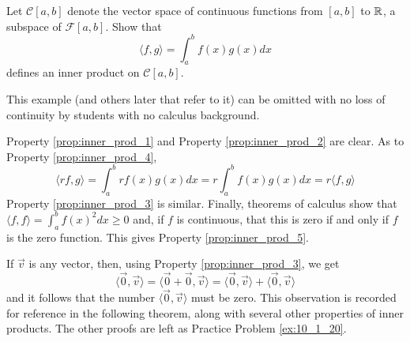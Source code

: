 \documentclass{ximera}
\begin{document}
\begin{example}\label{exa:030334}
Let $\mathcal{C}[a, b]$ denote the vector space of
continuous functions from $[a, b]$ to $\mathbb{R}$, a subspace of $\mathcal{F}[a, b]$. Show that
\begin{equation*}
\langle f, g \rangle = \int_{a}^{b} f(x)g(x)dx
\end{equation*}
defines an inner product on $\mathcal{C}[a, b]$.

\begin{remark}
    This example (and others later that refer to it) can be omitted with no loss of continuity by students with no calculus background.
\end{remark}

\begin{explanation}
 Property \ref{prop:inner_prod_1} and Property \ref{prop:inner_prod_2} are clear. As to  Property \ref{prop:inner_prod_4},
\begin{equation*}
\langle rf, g \rangle = \int_{a}^{b} rf(x)g(x)dx = r\int_{a}^{b} f(x)g(x)dx =
r\langle f, g \rangle
\end{equation*}
 Property \ref{prop:inner_prod_3} is similar. Finally, theorems of calculus show that $\langle f, f \rangle = \int_{a}^{b} f(x)^2dx \geq 0$ and, if $f$ is continuous, that this is zero if and only if $f$ is the zero function. This gives  Property \ref{prop:inner_prod_5}.
\end{explanation}
\end{example}


If $\vec{v}$ is any vector, then, using  Property \ref{prop:inner_prod_3}, we get
\begin{equation*}
\langle \vec{0}, \vec{v} \rangle = \langle \vec{0} + \vec{0}, \vec{v} \rangle =
\langle \vec{0}, \vec{v} \rangle + \langle \vec{0}, \vec{v} \rangle
\end{equation*}
and it follows that the number $\langle\vec{0}, \vec{v}\rangle$ must be zero. This observation is recorded for reference in the following theorem, along with several other properties of inner products. The other proofs are left as Practice Problem \ref{ex:10_1_20}.
\end{document}
